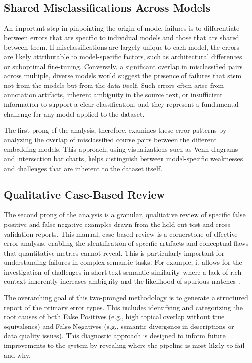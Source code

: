 \subsection{Shared Misclassifications Across Models}\label{ch:3.5.1}
An important step in pinpointing the origin of model failures is to differentiate between errors that are specific to individual models and those that are shared between them. If misclassifications are largely unique to each model, the errors are likely attributable to model-specific factors, such as architectural differences or suboptimal fine-tuning. Conversely, a significant overlap in misclassified pairs across multiple, diverse models would suggest the presence of  failures that stem not from the models but from the data itself. Such errors often arise from annotation artifacts, inherent ambiguity in the source text, or insufficient information to support a clear classification, and they represent a fundamental challenge for any model applied to the dataset.

The first prong of the analysis, therefore, examines these error patterns by analyzing the overlap of misclassified course pairs between the different embedding models. This approach, using visualizations such as Venn diagrams and intersection bar charts, helps distinguish between model-specific weaknesses and challenges that are inherent to the dataset itself.

\subsection{Qualitative Case-Based Review}\label{ch:3.5.2}
The second prong of the analysis is a granular, qualitative review of specific false positive and false negative examples drawn from the held-out test and cross-validation reports. This manual, case-based review is a cornerstone of effective error analysis, enabling the identification of specific artifacts and conceptual flaws that quantitative metrics cannot reveal. This is particularly important for understanding failures in complex semantic tasks. For example, it allows for the investigation of challenges in short-text semantic similarity, where a lack of rich context inherently increases ambiguity and the likelihood of spurious matches~\cite{app13063911}.

The overarching goal of this two-pronged methodology is to generate a structured report of the primary error types. This includes identifying and categorizing the root causes of both False Positives (e.g., high topical overlap without true equivalence) and False Negatives (e.g., semantic divergence in descriptions or data quality issues). This diagnostic approach is designed to inform future improvements to the system by revealing where the pipeline is most likely to fail and why.